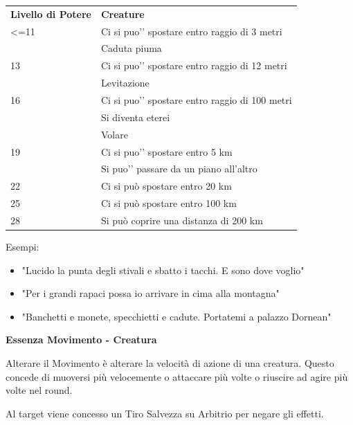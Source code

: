 \documentclass[a4paper,10 pt,twoside,openany]{book}
\begin{document}
\begin{tabularx}{0.95\textwidth}{lX}
	\toprule
	\textbf{Livello di Potere} & \textbf{Creature}\\
	<=11           & Ci si puo'’ spostare entro raggio di 3 metri       \\
	& Caduta piuma                                         \\
	13             & Ci si puo'’ spostare entro raggio di 12 metri        \\
	& Levitazione                                          \\
	16             & Ci si puo'’ spostare entro raggio di 100 metri       \\
	& Si diventa eterei                                    \\
	& Volare                                               \\
	19             & Ci si puo'’ spostare entro 5 km                      \\
	& Si puo'’ passare da un piano all’altro               \\
	22             & Ci si può spostare entro 20 km\\
	25             & Ci si può spostare entro 100 km\\
	28             & Si può coprire una distanza di 200 km\\
\end{tabularx}

\bigskip

Esempi:
\begin{itemize}
	\item
	"Lucido la punta degli stivali e sbatto i tacchi. E sono dove voglio"
	\item
	"Per i grandi rapaci possa io arrivare in cima alla montagna"
	\item
	"Banchetti e monete, specchietti e cadute. Portatemi a palazzo Dornean"
\end{itemize}

\bigskip

\textbf{Essenza Movimento - Creatura}

Alterare il Movimento è alterare la velocità di azione di una creatura.
Questo concede di muoversi più velocemente o attaccare più volte o riuscire ad agire più volte nel round.

Al target viene concesso un Tiro Salvezza su Arbitrio per negare gli effetti.

\bigskip
\end{document}
